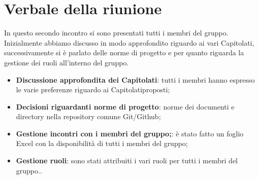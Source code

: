 \section{Verbale della riunione}
		In questo secondo incontro si sono presentati tutti i membri del gruppo. Inizialmente abbiamo discusso in modo approfondito riguardo ai vari Capitolati\glos, successivamente si è parlato delle norme di progetto e per quanto riguarda la gestione dei ruoli all'interno del gruppo. 
	\begin{itemize}
		\item \textbf {Discussione approfondita dei Capitolati\glos}: tutti i membri hanno espresso le varie preferenze riguardo ai Capitolati\glos proposti;
		\item \textbf {Decisioni riguardanti norme di progetto}: norme dei documenti e directory nella repository comune Git/Github;
		\item \textbf {Gestione incontri con i membri del gruppo;}: è stato fatto un foglio Excel con la disponibilità di tutti i membri del gruppo;
		\item \textbf {Gestione ruoli}: sono stati attribuiti i vari ruoli per tutti i membri del gruppo..
	\end{itemize}

